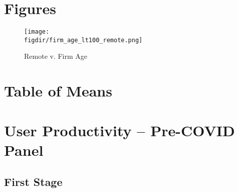 \documentclass{article}
\newcommand{\cleanedresultsdir}{../../results/cleaned}
\newcommand{\figdir}{../../results/figures}
\begin{document}


\section{Figures}

\begin{figure}[H]
  \centering
  \texttt{[image: \\figdir/firm\_age\_lt100\_remote.png]}
  \caption{Remote v. Firm Age}
\end{figure}



\section{Table of Means}
%
\section{User Productivity – Pre-COVID Panel}



\subsection{First Stage}

\end{document}
